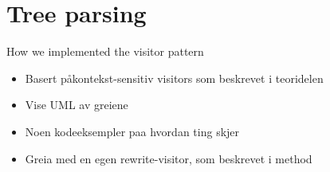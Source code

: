 \section{Tree parsing}
\label{sect:implementation:treeparsing}

How we implemented the visitor pattern

\begin{itemize}
  \item Basert p\aa kontekst-sensitiv visitors som beskrevet i teoridelen
  \item Vise UML av greiene
  \item Noen kodeeksempler paa hvordan ting skjer
  \item Greia med en egen rewrite-visitor, som beskrevet i method
\end{itemize}